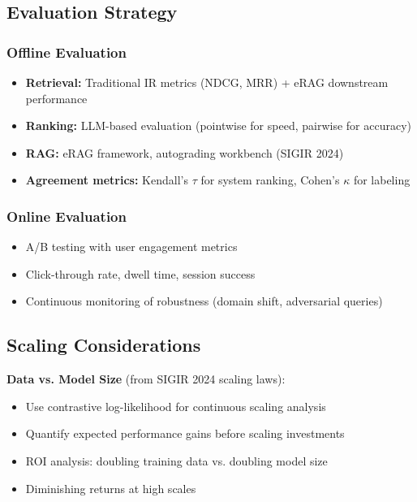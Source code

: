 \documentclass[11pt,letterpaper]{article}
\begin{document}
\subsection{Evaluation Strategy}

\subsubsection{Offline Evaluation}
\begin{itemize}[leftmargin=*]
    \item \textbf{Retrieval:} Traditional IR metrics (NDCG, MRR) + eRAG downstream performance
    \item \textbf{Ranking:} LLM-based evaluation (pointwise for speed, pairwise for accuracy)
    \item \textbf{RAG:} eRAG framework, autograding workbench (SIGIR 2024)
    \item \textbf{Agreement metrics:} Kendall's $\tau$ for system ranking, Cohen's $\kappa$ for labeling
\end{itemize}

\subsubsection{Online Evaluation}
\begin{itemize}[leftmargin=*]
    \item A/B testing with user engagement metrics
    \item Click-through rate, dwell time, session success
    \item Continuous monitoring of robustness (domain shift, adversarial queries)
\end{itemize}

\subsection{Scaling Considerations}

\textbf{Data vs. Model Size} (from SIGIR 2024 scaling laws):
\begin{itemize}[leftmargin=*]
    \item Use contrastive log-likelihood for continuous scaling analysis
    \item Quantify expected performance gains before scaling investments
    \item ROI analysis: doubling training data vs. doubling model size
    \item Diminishing returns at high scales
\end{itemize}
\end{document}
